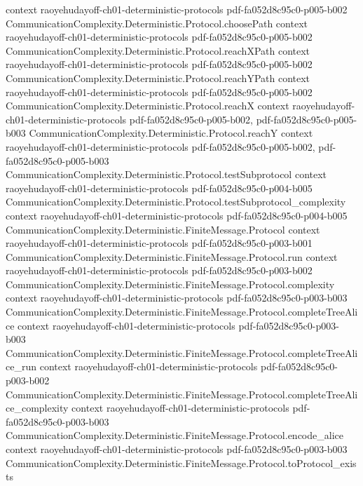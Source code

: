 \begin{lemma}
  {context}
  {raoyehudayoff-ch01-deterministic-protocols}
  {pdf-fa052d8c95c0-p005-b002}
\proofstep
  {CommunicationComplexity.Deterministic.Protocol.choosePath}
  {context}
  {raoyehudayoff-ch01-deterministic-protocols}
  {pdf-fa052d8c95c0-p005-b002}
\proofstep
  {CommunicationComplexity.Deterministic.Protocol.reachXPath}
  {context}
  {raoyehudayoff-ch01-deterministic-protocols}
  {pdf-fa052d8c95c0-p005-b002}
\proofstep
  {CommunicationComplexity.Deterministic.Protocol.reachYPath}
  {context}
  {raoyehudayoff-ch01-deterministic-protocols}
  {pdf-fa052d8c95c0-p005-b002}
\proofstep
  {CommunicationComplexity.Deterministic.Protocol.reachX}
  {context}
  {raoyehudayoff-ch01-deterministic-protocols}
  {pdf-fa052d8c95c0-p005-b002,
    pdf-fa052d8c95c0-p005-b003}
\proofstep
  {CommunicationComplexity.Deterministic.Protocol.reachY}
  {context}
  {raoyehudayoff-ch01-deterministic-protocols}
  {pdf-fa052d8c95c0-p005-b002,
    pdf-fa052d8c95c0-p005-b003}
\proofstep
  {CommunicationComplexity.Deterministic.Protocol.testSubprotocol}
  {context}
  {raoyehudayoff-ch01-deterministic-protocols}
  {pdf-fa052d8c95c0-p004-b005}
\proofstep
  {CommunicationComplexity.Deterministic.Protocol.testSubprotocol_complexity}
  {context}
  {raoyehudayoff-ch01-deterministic-protocols}
  {pdf-fa052d8c95c0-p004-b005}
\proofstep
  {CommunicationComplexity.Deterministic.FiniteMessage.Protocol}
  {context}
  {raoyehudayoff-ch01-deterministic-protocols}
  {pdf-fa052d8c95c0-p003-b001}
\proofstep
  {CommunicationComplexity.Deterministic.FiniteMessage.Protocol.run}
  {context}
  {raoyehudayoff-ch01-deterministic-protocols}
  {pdf-fa052d8c95c0-p003-b002}
\proofstep
  {CommunicationComplexity.Deterministic.FiniteMessage.Protocol.complexity}
  {context}
  {raoyehudayoff-ch01-deterministic-protocols}
  {pdf-fa052d8c95c0-p003-b003}
\proofstep
  {CommunicationComplexity.Deterministic.FiniteMessage.Protocol.completeTreeAlice}
  {context}
  {raoyehudayoff-ch01-deterministic-protocols}
  {pdf-fa052d8c95c0-p003-b003}
\proofstep
  {CommunicationComplexity.Deterministic.FiniteMessage.Protocol.completeTreeAlice_run}
  {context}
  {raoyehudayoff-ch01-deterministic-protocols}
  {pdf-fa052d8c95c0-p003-b002}
\proofstep
  {CommunicationComplexity.Deterministic.FiniteMessage.Protocol.completeTreeAlice_complexity}
  {context}
  {raoyehudayoff-ch01-deterministic-protocols}
  {pdf-fa052d8c95c0-p003-b003}
\proofstep
  {CommunicationComplexity.Deterministic.FiniteMessage.Protocol.encode_alice}
  {context}
  {raoyehudayoff-ch01-deterministic-protocols}
  {pdf-fa052d8c95c0-p003-b003}
\proofstep
  {CommunicationComplexity.Deterministic.FiniteMessage.Protocol.toProtocol_exists}

\end{lemma}
